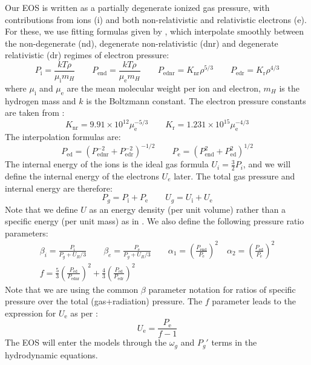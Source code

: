\documentclass[../main.tex]{subfiles}
\begin{document}
Our EOS is written as a partially degenerate ionized gas pressure, with contributions from ions (i) and both non-relativistic and relativistic electrons (e).  For these, we use fitting formulas given by \cite{Paczynski1983}, which interpolate smoothly between the non-degenerate (nd), degenerate non-relativistic (dnr) and degenerate relativistic (dr) regimes of electron pressure:
\begin{equation}
    P_\text{i}=\frac{kT\rho}{\mu_\text{i}m_H} \qquad 
    P_\text{end}=\frac{kT\rho}{\mu_\text{e}m_H} \qquad
    P_\text{ednr}=K_\text{nr}\rho^{5/3} \qquad
    P_\text{edr}=K_\text{r}\rho^{4/3}
\end{equation}
where $\mu_\text{i}$ and $\mu_\text{e}$ are the mean molecular weight per ion and electron, $m_H$ is the hydrogen mass and $k$ is the Boltzmann constant. The electron pressure constants are taken from \citet{Paczynski1983}:
\begin{equation}
    K_\text{nr}=9.91\times 10^{12}\mu_\text{e}^{-5/3} \qquad 
    K_\text{r}=1.231\times 10^{15}\mu_\text{e}^{-4/3}
\end{equation}
The interpolation formulas are:
\begin{equation}\label{eq:eos_electron_interp}
    P_\text{ed}=(P_\text{ednr}^{-2}+P_\text{edr}^{-2})^{-1/2} \qquad
    P_\text{e}=(P_\text{end}^2+P_\text{ed}^2)^{1/2}
\end{equation}
The internal energy of the ions is the ideal gas formula $U_i=\frac{3}{2}P_i$, and we will define the internal energy of the electrons $U_e$ later. The total gas pressure and internal energy are therefore:
\begin{equation}
    P_g=P_\text{i}+P_\text{e} \qquad U_g=U_\text{i}+U_\text{e}
\end{equation}
Note that we define $U$ as an energy density (per unit volume) rather than a specific energy (per unit mass) as in \cite{Paczynski1983}.  We also define the following pressure ratio parameters:
\begin{gather}
    \label{eq:pressure_params}
    \beta_i=\frac{P_\text{i}}{P_g+U_R/3} \qquad
    \beta_e=\frac{P_\text{e}}{P_g+U_R/3} \qquad%
    \alpha_1=\left(\frac{P_\text{end}}{P_\text{e}}\right)^2 \quad
    \alpha_2=\left(\frac{P_\text{ed}}{P_\text{e}}\right)^2 \nonumber\\
    f=\frac{5}{3}\left(\frac{P_\text{ed}}{P_\text{ednr}}\right)^2+\frac{4}{3}\left(\frac{P_\text{ed}}{P_\text{edr}}\right)^2
\end{gather}
Note that we are using the common $\beta$ parameter notation for ratios of specific pressure over the total (gas+radiation) pressure. The $f$ parameter leads to the expression for $U_\text{e}$ as per \citet{Paczynski1983}:
\begin{equation}
    \label{eq:Ue}
    U_\text{e}=\frac{P_\text{e}}{f-1}
\end{equation}
The EOS will enter the models through the $\omega_g$ and $P_g'$ terms in the hydrodynamic equations.
\end{document}
